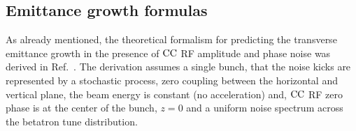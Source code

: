 \subsection{Emittance growth formulas}\label{subsec:CC_emit_growth_theoretical_formulas}
As already mentioned, the theoretical formalism for predicting the transverse emittance growth in the presence of ${\mathrm{CC}}$ RF amplitude and phase noise was derived in Ref.~\cite{PhysRevSTAB.18.101001}. The derivation assumes a single bunch, that the noise kicks are represented by a stochastic process, zero coupling between the horizontal and vertical plane, the beam energy is constant (no acceleration) and, ${\mathrm{CC}}$ RF zero phase is at the center of the bunch, $z=0$ and a uniform noise spectrum across the betatron tune distribution. 

